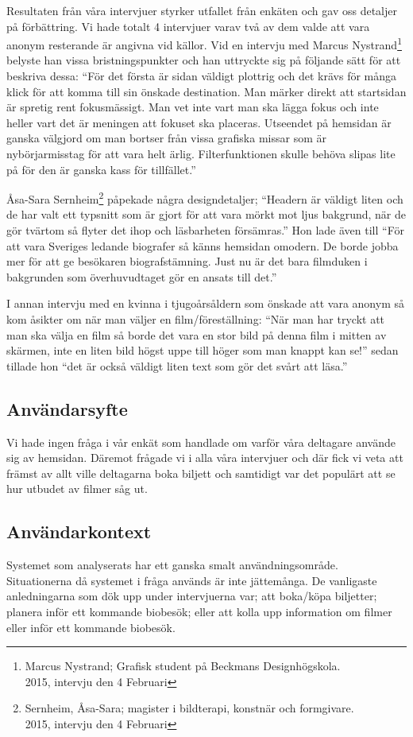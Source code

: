 \documentclass[swedish,a4paper,11pt]{article}
\begin{document}
Resultaten från våra intervjuer styrker utfallet från enkäten och gav oss detaljer på förbättring. Vi hade totalt 4 intervjuer varav två av dem valde att vara anonym resterande är angivna vid källor. 
Vid en intervju med Marcus Nystrand\footnote{Marcus Nystrand; Grafisk student på Beckmans Designhögskola. \\
2015, intervju den 4 Februari} belyste han vissa bristningspunkter och han uttryckte sig på följande sätt för att beskriva dessa: “För det första är sidan väldigt plottrig och det krävs för många klick för att komma till sin önskade destination. Man märker direkt att startsidan är spretig rent fokusmässigt. Man vet inte vart man ska lägga fokus och inte heller vart det är meningen att fokuset ska placeras. Utseendet på hemsidan är ganska välgjord om man bortser från vissa grafiska missar som är nybörjarmisstag för att vara helt ärlig. Filterfunktionen skulle behöva slipas lite på för den är ganska kass för tillfället.”

Åsa-Sara Sernheim\footnote{Sernheim, Åsa-Sara; magister i bildterapi, konstnär och formgivare.\\ 
2015, intervju den 4 Februari} påpekade några designdetaljer; “Headern är väldigt liten och de har valt ett typsnitt som är gjort för att vara mörkt mot ljus bakgrund, när de gör tvärtom så flyter det ihop och läsbarheten försämras.” Hon lade även till “För att vara Sveriges ledande biografer så känns hemsidan omodern. De borde jobba mer för att ge besökaren biografstämning. Just nu är det bara filmduken i bakgrunden som överhuvudtaget gör en ansats till det.”

I annan intervju med en kvinna i tjugoårsåldern som önskade att vara anonym så kom åsikter om när man väljer en film/föreställning: “När man har tryckt att man ska välja en film så borde det vara en stor bild på denna film i mitten av skärmen, inte en liten bild högst uppe till höger som man knappt kan se!” sedan tillade hon “det är också väldigt liten text som gör det svårt att läsa.”

\subsection{Användarsyfte} 
Vi hade ingen fråga i vår enkät som handlade om varför våra deltagare använde sig av hemsidan. Däremot frågade vi i alla våra intervjuer och där fick vi veta att främst av allt ville deltagarna boka biljett och samtidigt var det populärt att se hur utbudet av filmer såg ut. 

\subsection{Användarkontext} 
Systemet som analyserats har ett ganska smalt användningsområde.  Situationerna då systemet i fråga används är inte jättemånga. De vanligaste anledningarna som dök upp under intervjuerna var; att boka/köpa biljetter; planera inför ett kommande biobesök; eller att kolla upp information om filmer eller inför ett kommande biobesök. 
\end{document}
